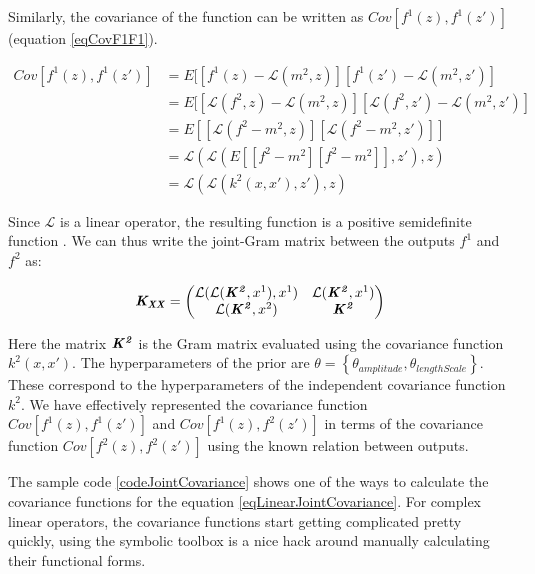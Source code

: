 Similarly, the covariance of the function can be written as $Cov[f^1(z), f^1(z')]$ (equation \ref{eqCovF1F1}). 

\begin{equation}\label{eqCovF1F1}
\begin{aligned}
Cov[f^1(z), f^1(z')]   & = E[[f^{1}(z) - \mathcal{L}(m^2, z)][f^{1}(z') - \mathcal{L}(m^2, z')] \\
            & = E[[\mathcal{L}\left ( f^{2}, z \right ) - \mathcal{L}(m^2, z)][\mathcal{L}\left ( f^{2}, z' \right ) - \mathcal{L}(m^2, z')] \\ 
            & = E[[\mathcal{L}\left ( f^{2} - m^2 , z \right )][\mathcal{L}\left ( f^{2} - m^2, z' \right )]] \\
            & = \mathcal{L}\left(\mathcal{L}\left(E[[f^{2} - m^2][f^{2} - m^2]], z'\right) , z\right) \\
            & = \mathcal{L}\left(\mathcal{L}\left(k^2(x, x'), z'\right) , z\right)
\end{aligned}
\end{equation}

Since $\mathcal{L}$ is a linear operator, the resulting function is a positive semidefinite function \cite{ginsbourger2013invariances, sarkka2011linear}. We can thus write the joint-Gram matrix between the outputs $f^1$ and $f^2$ as:

\begin{equation}\label{eqLinearJointCovariance}
    \bm{\mathit{K_{XX}}} = \begin{pmatrix}
    \mathcal{L}(\mathcal{L}(\bm{\mathit{K^2}}, x^{1}), x^{1}) & \mathcal{L}(\bm{\mathit{K^2}}, x^{1})\\ \mathcal{L}(\bm{\mathit{K^2}}, x^{2}) & \bm{\mathit{K^2}}
    \end{pmatrix} 
\end{equation}

Here the matrix $\bm{\mathit{K^2}}$ is the Gram matrix evaluated using the covariance function $k^2(x, x')$. The hyperparameters of the prior are \(\theta = \left \{ \theta_{amplitude}, \theta_{lengthScale} \right \}\). These correspond to the hyperparameters of the independent covariance function \(k^{2}\). We have effectively represented the covariance function \(Cov[f^1(z), f^1(z')]\) and \(Cov[f^1(z), f^2(z')]\) in terms of the covariance function $Cov[f^2(z), f^2(z')]$ using the known relation between outputs. 

The sample code \ref{codeJointCovariance} shows one of the ways to calculate the covariance functions for the equation \ref{eqLinearJointCovariance}. For complex linear operators, the covariance functions start getting complicated pretty quickly, using the symbolic toolbox is a nice hack around manually calculating their functional forms. 


